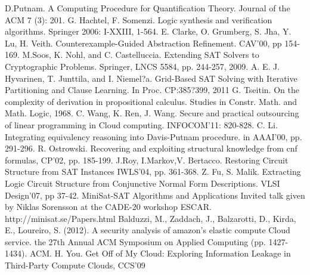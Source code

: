\documentclass[conference,compsocconf]{IEEEtran}
\begin{document}
%
%
%
\begin{thebibliography}{26}

D.Putnam.
A Computing Procedure for Quantification Theory.
Journal of the ACM 7 (3): 201.
G. Hachtel, F. Somenzi.
Logic synthesis and verification algorithms. Springer 2006: I-XXIII, 1-564.
E. Clarke, O. Grumberg, S. Jha, Y. Lu, H. Veith.
Counterexample-Guided Abstraction Refinement.
CAV'00, pp 154-169.
M.Soos, K. Nohl, and C. Castelluccia. Extending SAT Solvers to Cryptographic Problems.
 Springer, LNCS 5584, pp. 244-257, 2009.
A. E. J. Hyvarinen, T. Junttila, and I. Niemel?a.
Grid-Based SAT Solving with Iterative Partitioning and Clause Learning. In Proc. CP:385?399, 2011
G. Tseitin.
On the complexity of derivation in propositional calculus. Studies in Constr. Math. and Math. Logic, 1968.
C. Wang, K. Ren, J. Wang.
Secure and practical outsourcing of linear programming in Cloud computing. INFOCOM'11: 820-828.
C. Li.
Integrating equivalency reasoning into Davis-Putnam procedure. in AAAI'00, pp. 291-296.
R. Ostrowski.
Recovering and exploiting structural knowledge from cnf formulas, CP'02, pp. 185-199.
J.Roy, I.Markov,V. Bertacco.
Restoring Circuit Structure from SAT Instances IWLS'04, pp. 361-368.
Z. Fu, S. Malik.
Extracting Logic Circuit Structure from Conjunctive Normal Form Descriptions.
VLSI Design'07, pp 37-42.
MiniSat-SAT Algorithms and Applications Invited talk given by Niklas Sorensson at the CADE-20 workshop ESCAR.
http://minisat.se/Papers.html
Balduzzi, M., Zaddach, J., Balzarotti, D., Kirda, E., Loureiro, S. (2012).
A security analysis of amazon's elastic compute Cloud service. the 27th Annual ACM Symposium on Applied Computing (pp. 1427-1434). ACM.
H. You.
Get Off of My Cloud: Exploring Information Leakage in Third-Party Compute Clouds, CCS'09

\end{thebibliography}
\end{document}
